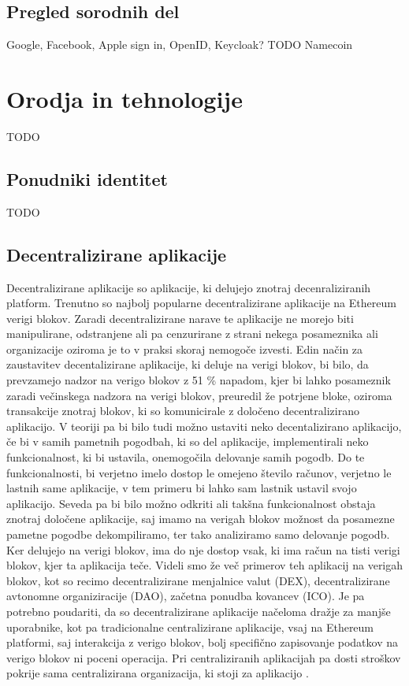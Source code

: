 \documentclass[a4paper,12pt,openright]{book}
\begin{document}
\section{Pregled sorodnih del}
Google, Facebook, Apple sign in, OpenID, Keycloak?
TODO
Namecoin


\chapter{Orodja in tehnologije}
TODO

\section{Ponudniki identitet}
TODO

\section{Decentralizirane aplikacije}
Decentralizirane aplikacije so aplikacije, ki delujejo znotraj decenraliziranih platform.
Trenutno so najbolj popularne decentralizirane aplikacije na Ethereum verigi blokov.
Zaradi decentralizirane narave te aplikacije ne morejo biti manipulirane, odstranjene ali pa cenzurirane z strani 
nekega posameznika ali organizacije oziroma je to v praksi skoraj nemogoče izvesti.
Edin način za zaustavitev decentalizirane aplikacije, ki deluje na verigi blokov, bi bilo, da prevzamejo nadzor na verigo blokov z 51 \% napadom, 
kjer bi lahko posameznik zaradi večinskega nadzora na verigi blokov, preuredil že potrjene bloke, oziroma transakcije znotraj blokov, ki so 
komunicirale z določeno decentralizirano aplikacijo. 
V teoriji pa bi bilo tudi možno ustaviti neko decentalizirano aplikacijo, če bi v samih pametnih pogodbah, ki so del aplikacije, implementirali
neko funkcionalnost, ki bi ustavila, onemogočila delovanje samih pogodb.
Do te funkcionalnosti, bi verjetno imelo dostop le omejeno število računov, verjetno le lastnih same aplikacije, 
v tem primeru bi lahko sam lastnik ustavil svojo aplikacijo.
Seveda pa bi bilo možno odkriti ali takšna funkcionalnost obstaja znotraj določene aplikacije, 
saj imamo na verigah blokov možnost da posamezne pametne pogodbe dekompiliramo, ter tako analiziramo samo delovanje pogodb.
Ker delujejo na verigi blokov, ima do nje dostop vsak, ki ima račun na tisti verigi blokov, kjer ta aplikacija teče.
Videli smo že več primerov teh aplikacij na verigah blokov, kot so recimo decentralizirane menjalnice valut (DEX),
decentralizirane avtonomne organiziracije (DAO), začetna ponudba kovancev (ICO).
Je pa potrebno poudariti, da so decentralizirane aplikacije načeloma dražje za manjše uporabnike, kot pa tradicionalne centralizirane aplikacije, 
vsaj na Ethereum platformi, saj interakcija z verigo blokov, bolj specifično zapisovanje podatkov na verigo blokov ni poceni operacija.
Pri centraliziranih aplikacijah pa dosti stroškov pokrije sama centralizirana organizacija, ki stoji za aplikacijo \cite{dapps_investopedia} \cite{51_attack_investopedia}.
\end{document}
